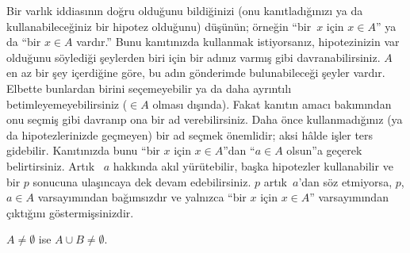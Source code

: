 \documentclass[../../../include/open-logic-section]{subfiles}
\begin{document}
Bir varlık iddiasının doğru olduğunu bildiğinizi (onu kanıtladığınızı
ya da kullanabileceğiniz bir hipotez olduğunu) düşünün; örneğin
``bir~$x$ için $x \in A$'' ya da ``bir $x \in A$ vardır.'' Bunu
kanıtınızda kullanmak istiyorsanız, hipotezinizin var olduğunu söylediği
şeylerden biri için bir adınız varmış gibi davranabilirsiniz. $A$ en az
bir şey içerdiğine göre, bu adın gönderimde bulunabileceği şeyler
vardır. Elbette bunlardan birini seçemeyebilir ya da daha ayrıntılı
betimleyemeyebilirsiniz ($\in A$ olması dışında). Fakat kanıtın amacı
bakımından onu seçmiş gibi davranıp ona bir ad verebilirsiniz. Daha önce
kullanmadığınız (ya da hipotezlerinizde geçmeyen) bir ad seçmek
önemlidir; aksi hâlde işler ters gidebilir. Kanıtınızda bunu ``bir $x$
için $x \in A$''dan ``$a \in A$ olsun''a geçerek belirtirsiniz. Artık
~$a$ hakkında akıl yürütebilir, başka hipotezler kullanabilir ve bir $p$
sonucuna ulaşıncaya dek devam edebilirsiniz. $p$ artık~$a$'dan söz
etmiyorsa, $p$, $a \in A$ varsayımından bağımsızdır ve yalnızca ``bir
$x$ için $x \in A$'' varsayımından çıktığını göstermişsinizdir.

\begin{prop}
$A \neq \emptyset$ ise $A \cup B \neq \emptyset$.
\end{prop}
\end{document}
